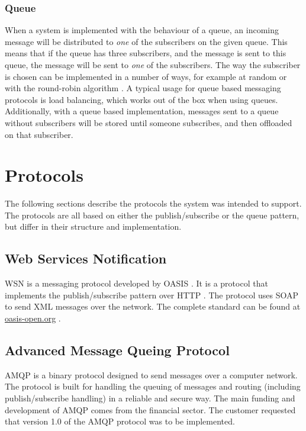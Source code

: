 \subsubsection{Queue}
When a system is implemented with the behaviour of a queue, an incoming message will be distributed to \textit{one} of the subscribers on the given queue. This means that if the queue has three subscribers, and the message is sent to this queue, the message will be sent to \textit{one} of the subscribers. The way the subscriber is chosen can be implemented in a number of ways, for example at random or with the round-robin algorithm \cite{round-robin}. A typical usage for queue based messaging protocols is load balancing, which works out of the box when using queues. Additionally, with a queue based implementation, messages sent to a queue without subscribers will be stored until someone subscribes, and then offloaded on that subscriber.

\section{Protocols}
\label{prestudies-protocols}

The following sections describe the protocols the system was intended to support. The protocols are all based on either the publish/subscribe or the queue pattern, but differ in their structure and implementation.

\subsection{Web Services Notification}
\label{subsec:prestudies-wsnotification}

WSN is a messaging protocol developed by OASIS \cite{oasis}. It is a protocol that implements the publish/subscribe pattern over HTTP \cite{http}. The protocol uses SOAP \cite{soap} to send XML \cite{xml} messages over the network. The complete standard can be found at \url{oasis-open.org} \cite{wsn-basenotification}.

\subsection{Advanced Message Queing Protocol}
\label{subsec:prestudies-amqp}
AMQP is a binary protocol designed to send messages over a computer network. The protocol is built for handling the queuing of messages and routing (including publish/subscribe handling) in a reliable and secure way. The main funding and development of AMQP comes from the financial sector. The customer requested that version 1.0 of the AMQP protocol was to be implemented.


